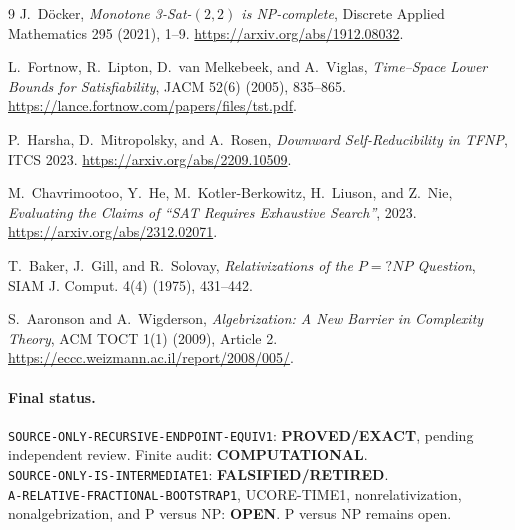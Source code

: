 \documentclass[11pt]{article}
\newcommand{\EXACT}{\textbf{PROVED/EXACT}}
\newcommand{\OPEN}{\textbf{OPEN}}
\newcommand{\RETIRED}{\textbf{FALSIFIED/RETIRED}}
\newcommand{\COMP}{\textbf{COMPUTATIONAL}}
\begin{document}
\begin{thebibliography}{9}
J.~D\"ocker, \emph{Monotone 3-Sat-$(2,2)$ is NP-complete},
Discrete Applied Mathematics 295 (2021), 1--9.
\url{https://arxiv.org/abs/1912.08032}.

L.~Fortnow, R.~Lipton, D.~van Melkebeek, and A.~Viglas,
\emph{Time--Space Lower Bounds for Satisfiability}, JACM 52(6) (2005),
835--865. \url{https://lance.fortnow.com/papers/files/tst.pdf}.

P.~Harsha, D.~Mitropolsky, and A.~Rosen,
\emph{Downward Self-Reducibility in TFNP}, ITCS 2023.
\url{https://arxiv.org/abs/2209.10509}.

M.~Chavrimootoo, Y.~He, M.~Kotler-Berkowitz, H.~Liuson, and Z.~Nie,
\emph{Evaluating the Claims of ``SAT Requires Exhaustive Search''}, 2023.
\url{https://arxiv.org/abs/2312.02071}.

T.~Baker, J.~Gill, and R.~Solovay,
\emph{Relativizations of the $P=?NP$ Question}, SIAM J. Comput. 4(4)
(1975), 431--442.

S.~Aaronson and A.~Wigderson,
\emph{Algebrization: A New Barrier in Complexity Theory}, ACM TOCT 1(1)
(2009), Article 2. \url{https://eccc.weizmann.ac.il/report/2008/005/}.
\end{thebibliography}

\paragraph{Final status.}
\texttt{SOURCE-ONLY-RECURSIVE-ENDPOINT-EQUIV1}: \EXACT, pending independent
review.  Finite audit: \COMP.\\
\texttt{SOURCE-ONLY-IS-INTERMEDIATE1}: \RETIRED.\\
\texttt{A-RELATIVE-FRACTIONAL-BOOTSTRAP1}, UCORE-TIME1,
nonrelativization, nonalgebrization, and P versus NP: \OPEN.
P versus NP remains open.

\end{document}
